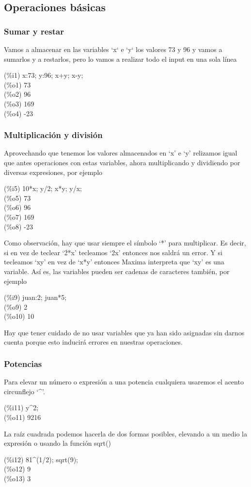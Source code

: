 \documentclass[a4paper, 12pt] {article}
\begin{document}
\subsection{Operaciones básicas}
\subsubsection{Sumar y restar}
Vamos a almacenar en las variables `x` e `y` los valores 73 y 96 y vamos a sumarlos y a restarlos, pero lo vamos a realizar todo el input en una sola línea
\begin{center}
  (\%i1) x:73; y:96; x+y; x-y; \\(\%o1) 73 \\(\%o2) 96 \\(\%o3) 169 \\(\%o4) -23
\end{center}
\subsubsection{Multiplicación y división}
Aprovechando que tenemos los valores almacenados en `x' e `y' relizamos igual que antes operaciones con estas variables, ahora multiplicando y dividiendo por diversas expresiones, por ejemplo
\begin{center}
  (\%i5) 10*x; y/2; x*y; y/x; \\(\%o5) 73 \\(\%o6) 96 \\(\%o7) 169 \\(\%o8) -23
\end{center}
Como observación, hay que usar siempre el símbolo `*' para multiplicar. Es decir, si en vez de teclear `2*x' tecleamos `2x' entonces nos saldrá un error. Y si tecleamos `xy' en vez de `x*y' entonces Maxima interpreta que `xy' es una variable. Así es, las variables pueden ser cadenas de caracteres también, por ejemplo
\begin{center}
    (\%i9) juan:2; juan*5;\\(\%o9) 2\\(\%o10) 10
\end{center}
Hay que tener cuidado de no usar variables que ya han sido asignadas sin darnos cuenta porque esto inducirá errores en nuestras operaciones.
\pagebreak
\subsubsection{Potencias}
Para elevar un número o expresión a una potencia cualquiera usaremos el acento circunflejo `\^{}'.
\begin{center}
    (\%i11) y\^{}2;\\(\%o11) 9216
\end{center}
La raíz cuadrada podemos hacerla de dos formas posibles, elevando a un medio la expresión o usando la función sqrt()
\begin{center}
    (\%i12) 81\^{}(1/2); sqrt(9);\\(\%o12) 9\\(\%o13) 3
\end{center}
\end{document}

